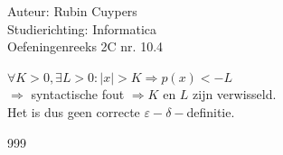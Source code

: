 \documentclass[a4paper]{article}
\begin{document}
  
\noindent \large Auteur: Rubin Cuypers \\
\noindent \large Studierichting: Informatica\\
\noindent \large Oefeningenreeks 2C nr. 10.4\\

\medskip

\normalsize

$\forall K>0,\exists L>0:|x|>K \Rightarrow p(x)<-L$\\

$\Rightarrow$ syntactische fout $\Rightarrow K$ en $L$ zijn verwisseld.\\

Het is dus geen correcte $\varepsilon-\delta-$definitie.  \\

\begin{thebibliography}{999}
\end{thebibliography}
\end{document}
